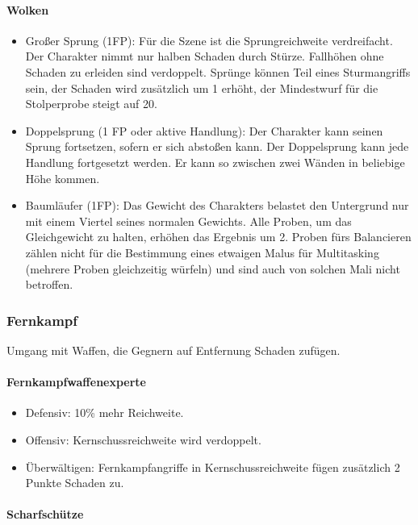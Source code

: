 \documentclass{article}
\begin{document}
\paragraph{Wolken}

\begin{itemize}
\item Großer Sprung (1FP): Für die Szene ist die Sprungreichweite verdreifacht. Der Charakter nimmt nur halben Schaden durch Stürze. Fallhöhen ohne Schaden zu erleiden sind verdoppelt. Sprünge können Teil eines Sturmangriffs sein, der Schaden wird zusätzlich um 1 erhöht, der Mindestwurf für die Stolperprobe steigt auf 20.
\item Doppelsprung (1 FP oder aktive Handlung): Der Charakter kann seinen Sprung fortsetzen, sofern er sich abstoßen kann. Der Doppelsprung kann jede Handlung fortgesetzt werden. Er kann so zwischen zwei Wänden in beliebige Höhe kommen.
\item Baumläufer (1FP): Das Gewicht des Charakters belastet den Untergrund nur mit einem Viertel seines normalen Gewichts. Alle Proben, um das Gleichgewicht zu halten, erhöhen das Ergebnis um 2. Proben fürs Balancieren zählen nicht für die Bestimmung eines etwaigen Malus für Multitasking (mehrere Proben gleichzeitig würfeln) und sind auch von solchen Mali nicht betroffen.
\end{itemize}

\subsubsection{Fernkampf}

Umgang mit Waffen, die Gegnern auf Entfernung Schaden zufügen.

\paragraph{Fernkampfwaffenexperte}

\begin{itemize}
\item Defensiv: 10\% mehr Reichweite.
\item Offensiv: Kernschussreichweite wird verdoppelt.
\item Überwältigen: Fernkampfangriffe in Kernschussreichweite fügen zusätzlich 2 Punkte Schaden zu.
\end{itemize}

\paragraph{Scharfschütze}
\end{document}
